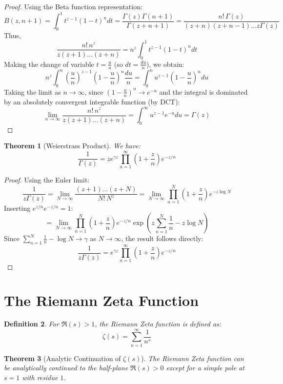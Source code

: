 \documentclass[a4paper,11pt]{article}
\newtheorem{theorem}{Theorem}
\newtheorem{definition}[theorem]{Definition}
\begin{document}
\begin{proof}
  Using the Beta function representation:
  \[ B(z, n+1) = \int_{0}^{1} t^{z-1}(1-t)^n dt =
    \frac{\Gamma(z)\Gamma(n+1)}{\Gamma(z+n+1)} = \frac{n! \,
  \Gamma(z)}{(z+n)(z+n-1)\dots z \Gamma(z)} \]
  Thus,
  \[ \frac{n! \, n^z}{z(z+1)\dots(z+n)} = n^z \int_{0}^{1} t^{z-1}(1-t)^n dt \]
  Making the change of variable $t = \frac{u}{n}$ (so $dt =
  \frac{du}{n}$), we obtain:
  \[ n^z \int_{0}^{n} \left(\frac{u}{n}\right)^{z-1}
    \left(1-\frac{u}{n}\right)^n \frac{du}{n} = \int_{0}^{n} u^{z-1}
  \left(1-\frac{u}{n}\right)^n du \]
  Taking the limit as $n \to \infty$, since $(1-\frac{u}{n})^n \to
  e^{-u}$ and the integral is dominated by an absolutely convergent
  integrable function (by DCT):
  \[ \lim_{n \to \infty} \frac{n! \, n^z}{z(z+1)\dots(z+n)} =
  \int_{0}^{\infty} u^{z-1} e^{-u} du = \Gamma(z) \]
\end{proof}

\begin{theorem}[Weierstrass Product]
  We have:
  \[ \frac{1}{\Gamma(z)} = z e^{\gamma z} \prod_{n=1}^{\infty}
  \left(1+\frac{z}{n}\right) e^{-z/n} \]
\end{theorem}

\begin{proof}
  Using the Euler limit:
  \[ \frac{1}{z\Gamma(z)} = \lim_{N \to \infty}
    \frac{(z+1)\dots(z+N)}{N! \, N^z} = \lim_{N \to \infty}
  \prod_{n=1}^{N} \left(1+\frac{z}{n}\right) e^{-z \log N} \]
  Inserting $e^{z/n} e^{-z/n} = 1$:
  \[ = \lim_{N \to \infty} \prod_{n=1}^{N} \left(1+\frac{z}{n}\right)
  e^{-z/n} \exp\left(z \sum_{n=1}^{N} \frac{1}{n} - z \log N\right) \]
  Since $\sum_{n=1}^{N} \frac{1}{n} - \log N \to \gamma$ as $N \to
  \infty$, the result follows directly:
  \[ \frac{1}{z\Gamma(z)} = e^{\gamma z} \prod_{n=1}^{\infty}
  \left(1+\frac{z}{n}\right) e^{-z/n} \]
\end{proof}

\section{The Riemann Zeta Function}

\begin{definition}
  For $\Re(s) > 1$, the Riemann Zeta function is defined as:
  \[ \zeta(s) = \sum_{n=1}^{\infty} \frac{1}{n^s} \]
\end{definition}

\begin{theorem}[Analytic Continuation of $\zeta(s)$]
  The Riemann Zeta function can be analytically continued to the
  half-plane $\Re(s) > 0$ except for a simple pole at $s = 1$ with residue $1$.
\end{theorem}
\end{document}

